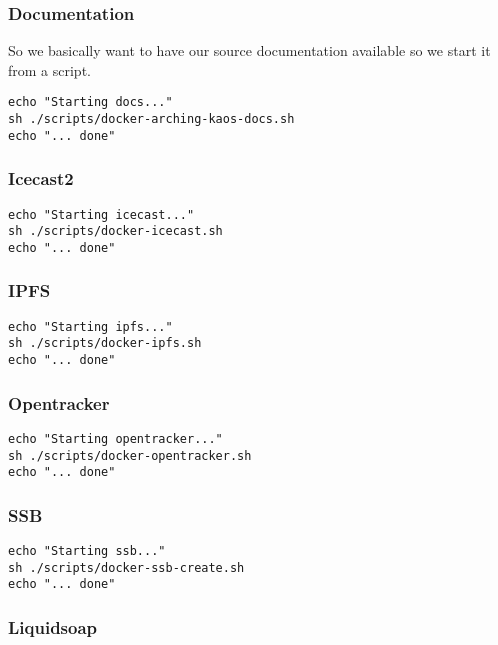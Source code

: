 \documentclass[12pt]{report}
\begin{document}
\subsubsection{Documentation}\label{documentation}

So we basically want to have our source documentation available so we
start it from a script.

\begin{verbatim}
echo "Starting docs..."
sh ./scripts/docker-arching-kaos-docs.sh
echo "... done"
\end{verbatim}


\subsubsection{Icecast2}\label{icecast2-1}

\begin{verbatim}
echo "Starting icecast..."
sh ./scripts/docker-icecast.sh
echo "... done"
\end{verbatim}


\subsubsection{IPFS}\label{ipfs}

\begin{verbatim}
echo "Starting ipfs..."
sh ./scripts/docker-ipfs.sh
echo "... done"
\end{verbatim}


\subsubsection{Opentracker}\label{opentracker}

\begin{verbatim}
echo "Starting opentracker..."
sh ./scripts/docker-opentracker.sh
echo "... done"
\end{verbatim}


\subsubsection{SSB}\label{ssb}

\begin{verbatim}
echo "Starting ssb..."
sh ./scripts/docker-ssb-create.sh
echo "... done"
\end{verbatim}


\subsubsection{Liquidsoap}\label{liquidsoap-1}
\end{document}
